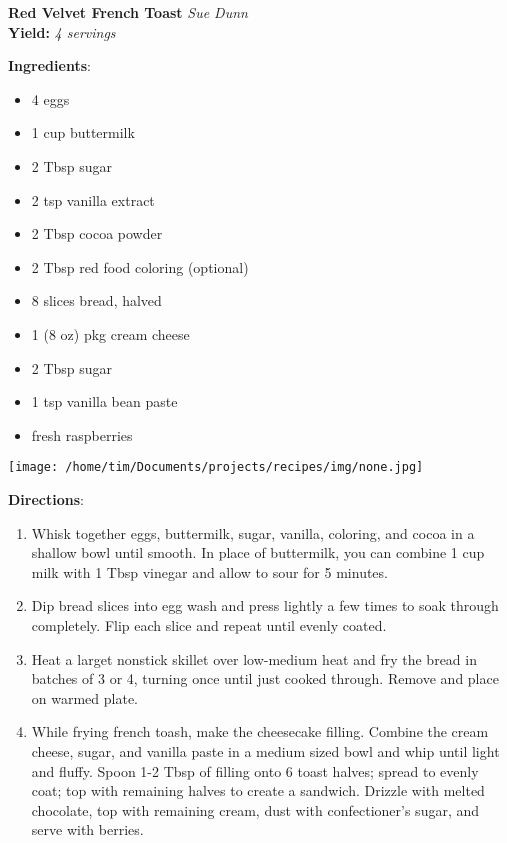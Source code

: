 \documentclass[11pt, twoside, openany]{book}
\begin{document}
\noindent\begin{minipage}[t]{\linewidth}%
{\Large\textbf{Red Velvet French Toast}} \label{red-velvet-french-toast}\hfill\textit{Sue Dunn}\\
\textbf{Yield:} \textit{4 servings}\\
\noindent\begin{minipage}[t]{0.78\linewidth}%
\textbf{Ingredients}:\vspace{-3mm}
\begin{multicols}{2}
\begin{itemize}\setlength\itemsep{-1mm}
\item 4 eggs
\item 1 cup buttermilk
\item 2 Tbsp sugar
\item 2 tsp vanilla extract
\item 2 Tbsp cocoa powder
\item 2 Tbsp red food coloring (optional)
\item 8 slices bread, halved
\item 1 (8 oz) pkg cream cheese
\item 2 Tbsp sugar
\item 1 tsp vanilla bean paste
\item fresh raspberries
\end{itemize}
\end{multicols}
\end{minipage}
\noindent\begin{minipage}[t]{0.18\linewidth}
\centering \strut\vspace*{-\baselineskip}\newline
\texttt{[image: /home/tim/Documents/projects/recipes/img/none.jpg]}\\
\end{minipage}\vspace{3mm}
\textbf{Directions}:
\vspace{-3mm}\begin{enumerate}\setlength\itemsep{-1mm}
\item Whisk together eggs, buttermilk, sugar, vanilla, coloring, and cocoa in a shallow bowl until smooth. In place of buttermilk, you can combine 1 cup milk with 1 Tbsp vinegar and allow to sour for 5 minutes.
\item Dip bread slices into egg wash and press lightly a few times to soak through completely. Flip each slice and repeat until evenly coated.
\item Heat a larget nonstick skillet over low-medium heat and fry the bread in batches of 3 or 4, turning once until just cooked through. Remove and place on warmed plate.
\item While frying french toash, make the cheesecake filling. Combine the cream cheese, sugar, and vanilla paste in a medium sized bowl and whip until light and fluffy. Spoon 1-2 Tbsp of filling onto 6 toast halves; spread to evenly coat; top with remaining halves to create a sandwich. Drizzle with melted chocolate, top with remaining cream, dust with confectioner's sugar, and serve with berries.
\end{enumerate}
\end{minipage}\vspace{8mm}
\end{document}
